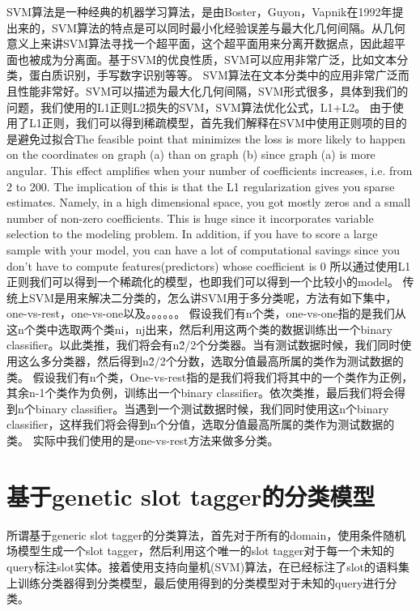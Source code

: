 \documentclass[master]{njuthesis}
\begin{document}
SVM算法是一种经典的机器学习算法，是由Boster，Guyon，Vapnik在1992年提出来的，SVM算法的特点是可以同时最小化经验误差与最大化几何间隔。从几何意义上来讲SVM算法寻找一个超平面，这个超平面用来分离开数据点，因此超平面也被成为分离面。基于SVM的优良性质，SVM可以应用非常广泛，比如文本分类，蛋白质识别，手写数字识别等等。
SVM算法在文本分类中的应用非常广泛而且性能非常好。SVM可以描述为最大化几何间隔，SVM形式很多，具体到我们的问题，我们使用的L1正则L2损失的SVM，SVM算法优化公式，L1+L2。
由于使用了L1正则，我们可以得到稀疏模型，首先我们解释在SVM中使用正则项的目的是避免过拟合The feasible point that minimizes the loss is more likely to happen on the coordinates on graph (a) than on graph (b) since graph (a) is more angular.  This effect amplifies when your number of coefficients increases, i.e. from 2 to 200. The implication of this is that the L1 regularization gives you sparse estimates. Namely, in a high dimensional space, you got mostly zeros and a small number of non-zero coefficients. This is huge since it incorporates variable selection to the modeling problem. In addition, if you have to score a large sample with your model, you can have a lot of computational savings since you don't have to compute features(predictors) whose coefficient is 0
所以通过使用L1正则我们可以得到一个稀疏化的模型，也即我们可以得到一个比较小的model。
传统上SVM是用来解决二分类的，怎么讲SVM用于多分类呢，方法有如下集中，one-vs-rest，one-vs-one以及。。。。。。
假设我们有n个类，one-vs-one指的是我们从这n个类中选取两个类ni，nj出来，然后利用这两个类的数据训练出一个binary classifier。以此类推，我们将会有n\^2/2个分类器。当有测试数据时候，我们同时使用这么多分类器，然后得到n\^2/2个分数，选取分值最高所属的类作为测试数据的类。
假设我们有n个类，One-vs-rest指的是我们将我们将其中的一个类作为正例，其余n-1个类作为负例，训练出一个binary classifier。依次类推，最后我们将会得到n个binary classifier。当遇到一个测试数据时候，我们同时使用这n个binary classifier，这样我们将会得到n个分值，选取分值最高所属的类作为测试数据的类。
实际中我们使用的是one-vs-rest方法来做多分类。


\section{基于genetic slot tagger的分类模型}

    所谓基于generic slot tagger的分类算法，首先对于所有的domain，使用条件随机场模型生成一个slot tagger，然后利用这个唯一的slot tagger对于每一个未知的query标注slot实体。接着使用支持向量机(SVM)算法，在已经标注了slot的语料集上训练分类器得到分类模型，最后使用得到的分类模型对于未知的query进行分类。
    
\end{document}
